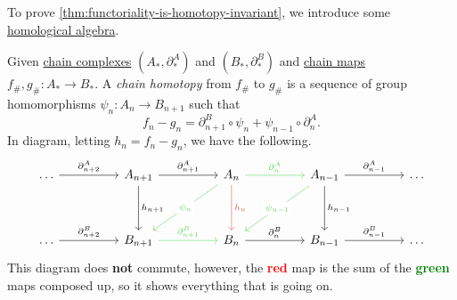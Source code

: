 To prove \autoref{thm:functoriality-is-homotopy-invariant}, we introduce some \hyperref[sec:homological-algebra]{homological algebra}.

\begin{definition}\label{def:chain-homotopy}
	Given \hyperref[def:chain-complex]{chain complexes} $(A_\ast, \partial ^A_\ast)$ and $(B_\ast, \partial^B_\ast)$ and \hyperref[def:chain-map]{chain maps}
	$f_\#, g_\# \colon  A_\ast \to B_\ast$. A \emph{chain homotopy} from $f_\#$ to $g_\#$ is a sequence of group homomorphisms $\psi_n\colon A_n \to B_{n + 1}$ such that
	\[
		f_n - g_n = \partial ^B_{n + 1} \circ \psi_n + \psi_{n - 1} \circ \partial _n^A.
	\]
	In diagram, letting $h_n = f_n - g_n$, we have the following.
	\[
		\begin{tikzcd}
			\ldots && {A_{n+1}} && {A_{n}} && {A_{n-1}} && \ldots \\
			\\
			\ldots && {B_{n+1}} && {B_{n}} && {B_{n-1}} && \ldots
			\arrow["{\partial^A_{n-1}}", from=1-7, to=1-9]
			\arrow["{\partial^B_{n-1}}", from=3-7, to=3-9]
			\arrow["{\partial^A_{n}}", color={rgb,255:red,92;green,214;blue,92}, from=1-5, to=1-7]
			\arrow["{\partial^B_{n}}", from=3-5, to=3-7]
			\arrow["{\partial^B_{n+1}}", color={rgb,255:red,92;green,214;blue,92}, from=3-3, to=3-5]
			\arrow["{\partial^A_{n+2}}", from=1-1, to=1-3]
			\arrow["{\partial^B_{n+2}}", from=3-1, to=3-3]
			\arrow["{h_{n+1}}", from=1-3, to=3-3]
			\arrow["{h_{n}}", color={rgb,255:red,214;green,92;blue,92}, from=1-5, to=3-5]
			\arrow["{h_{n-1}}", from=1-7, to=3-7]
			\arrow["{\partial^A_{n+1}}", from=1-3, to=1-5]
			\arrow["{\psi_n}"{description}, color={rgb,255:red,92;green,214;blue,92}, from=1-5, to=3-3]
			\arrow["{\psi_{n-1}}"{description}, color={rgb,255:red,92;green,214;blue,92}, from=1-7, to=3-5]
		\end{tikzcd}
	\]
	This diagram does \textbf{not} commute, however, the \textbf{\textcolor{red}{red}} map is the sum of the
	\textbf{\textcolor{green}{green}} maps composed up, so it shows everything that is going on.
\end{definition}

